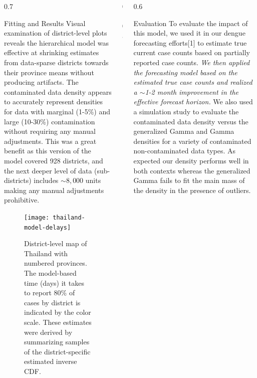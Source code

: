 \documentclass[final]{beamer}
\newlength{\onecolwid}
\begin{document}
\begin{frame}[t]
\begin{columns}[t]
\begin{column}{0.7\onecolwid}
\begin{block}{Fitting and Results}
Visual examination of district-level plots reveals the hierarchical model was effective at shrinking estimates from data-sparse districts towards their province means without producing artifacts.  The contaminated data density appears to accurately represent densities for data with marginal (1-5\%) and large (10-30\%) contamination without requiring any manual adjustments.  This was a great benefit as this version of the model covered 928 districts, and the next deeper level of data (sub-districts) includes $\sim8,000$ units making any manual adjustments prohibitive.
\end{block}


\vspace{0.5in}

\begin{figure}
 \begin{center}
    \texttt{[image: thailand-model-delays]}
 \end{center}
 \caption{\small District-level map of Thailand with numbered provinces.  The model-based time (days) it takes to report 80\% of cases by district is indicated by the color scale.  These estimates were derived by summarizing samples of the district-specific estimated inverse CDF.}
\end{figure}

\end{column}


\begin{column}{0.05\onecolwid}
\end{column}

\begin{column}{0.6\onecolwid} 


\begin{block}{Evaluation}
To evaluate the impact of this model, we used it in our dengue forecasting efforts[1] to estimate true current case counts based on partially reported case counts.  \emph{We then applied the forecasting model based on the estimated true case counts and realized a $\sim$1-2 month improvement in the effective forecast horizon.} We also used a simulation study to evaluate the contaminated data density versus the generalized Gamma and Gamma densities for a variety of contaminated non-contaminated data types.  As expected our density performs well in both contexts whereas the generalized Gamma fails to fit the main mass of the density in the presence of outliers.

\end{block}



\end{column}
\end{columns}
\end{frame}
\end{document}

